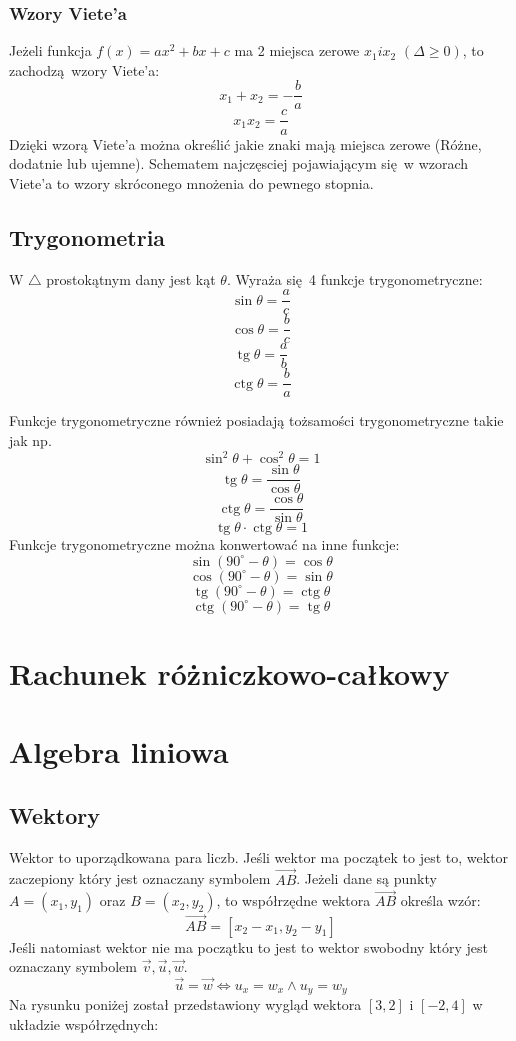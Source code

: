 \documentclass[12pt, a4paper]{article}
\DeclareMathOperator{\tg}{tg}
\DeclareMathOperator{\ctg}{ctg}
\begin{document}
\subsubsection*{Wzory Viete'a}
Jeżeli funkcja $f(x) = ax^2 + bx + c$ ma 2 miejsca zerowe $x_1 i x_2$ $(\Delta \geq 0)$, to zachodzą wzory Viete'a:
$$x_1 + x_2 = -\frac{b}{a}$$
$$x_1x_2 = \frac{c}{a}$$
Dzięki wzorą Viete'a można określić jakie znaki mają miejsca zerowe (Różne, dodatnie lub ujemne). Schematem najczęsciej
pojawiającym się w wzorach Viete'a to wzory skróconego mnożenia do pewnego stopnia.
\subsection{Trygonometria}
W $\triangle$ prostokątnym dany jest kąt $\theta$. Wyraża się 4 funkcje trygonometryczne:
$$\sin\theta=\frac{a}{c}$$
$$\cos\theta=\frac{b}{c}$$
$$\tg\theta=\frac{a}{b}$$
$$\ctg\theta=\frac{b}{a}$$
\begin{center}
\end{center}
Funkcje trygonometryczne również posiadają tożsamości trygonometryczne takie jak np.
$$\sin^2\theta+\cos^2\theta = 1$$
$$\tg\theta=\frac{\sin\theta}{\cos\theta}$$
$$\ctg\theta=\frac{\cos\theta}{\sin\theta}$$
$$\tg\theta\cdot\ctg\theta=1$$
Funkcje trygonometryczne można konwertować na inne funkcje:
$$\sin(90^{\circ}-\theta)=\cos\theta$$
$$\cos(90^{\circ}-\theta)=\sin\theta$$
$$\tg(90^{\circ}-\theta)=\ctg\theta$$
$$\ctg(90^{\circ}-\theta)=\tg\theta$$
\section{Rachunek różniczkowo-całkowy}
\section{Algebra liniowa}
\subsection{Wektory}
Wektor to uporządkowana para liczb. Jeśli wektor ma początek to jest to, wektor
zaczepiony który jest oznaczany symbolem $\overrightarrow{AB}$. Jeżeli dane są punkty
$A = (x_1,y_1)$ oraz $B = (x_2,y_2)$,
to współrzędne wektora $\overrightarrow{AB}$ określa wzór: $$\overrightarrow{AB} = [x_2-x_1,y_2-y_1]$$
Jeśli natomiast wektor nie ma początku to jest to wektor swobodny który
jest oznaczany symbolem $\overrightarrow{v}, \overrightarrow{u}, \overrightarrow{w}$.
$$\overrightarrow{u} = \overrightarrow{w} \Longleftrightarrow u_x = w_x \wedge u_y = w_y$$
Na rysunku poniżej został przedstawiony wygląd wektora $[3,2]$ i $[-2,4]$ w układzie współrzędnych:
\end{document}
